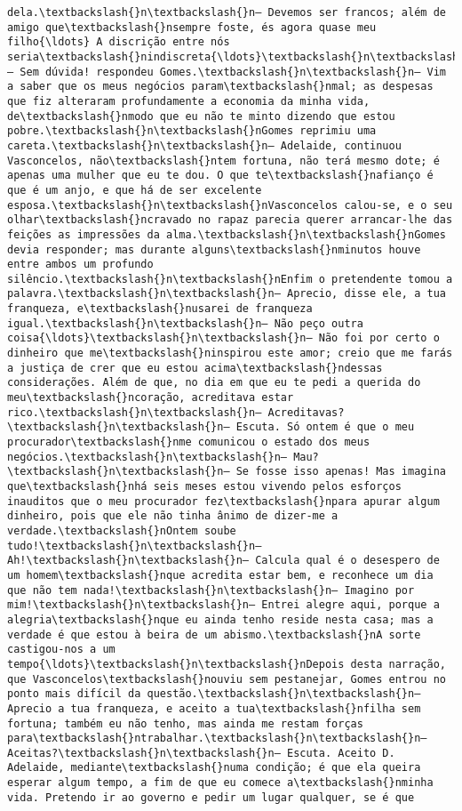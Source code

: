 \begin{Verbatim}[commandchars=\\\{\}]
dela.\textbackslash{}n\textbackslash{}n— Devemos ser francos; além de amigo que\textbackslash{}nsempre foste, és agora quase meu filho{\ldots} A discrição entre nós seria\textbackslash{}nindiscreta{\ldots}\textbackslash{}n\textbackslash{}n— Sem dúvida! respondeu Gomes.\textbackslash{}n\textbackslash{}n— Vim a saber que os meus negócios param\textbackslash{}nmal; as despesas que fiz alteraram profundamente a economia da minha vida, de\textbackslash{}nmodo que eu não te minto dizendo que estou pobre.\textbackslash{}n\textbackslash{}nGomes reprimiu uma careta.\textbackslash{}n\textbackslash{}n— Adelaide, continuou Vasconcelos, não\textbackslash{}ntem fortuna, não terá mesmo dote; é apenas uma mulher que eu te dou. O que te\textbackslash{}nafianço é que é um anjo, e que há de ser excelente esposa.\textbackslash{}n\textbackslash{}nVasconcelos calou-se, e o seu olhar\textbackslash{}ncravado no rapaz parecia querer arrancar-lhe das feições as impressões da alma.\textbackslash{}n\textbackslash{}nGomes devia responder; mas durante alguns\textbackslash{}nminutos houve entre ambos um profundo silêncio.\textbackslash{}n\textbackslash{}nEnfim o pretendente tomou a palavra.\textbackslash{}n\textbackslash{}n— Aprecio, disse ele, a tua franqueza, e\textbackslash{}nusarei de franqueza igual.\textbackslash{}n\textbackslash{}n— Não peço outra coisa{\ldots}\textbackslash{}n\textbackslash{}n— Não foi por certo o dinheiro que me\textbackslash{}ninspirou este amor; creio que me farás a justiça de crer que eu estou acima\textbackslash{}ndessas considerações. Além de que, no dia em que eu te pedi a querida do meu\textbackslash{}ncoração, acreditava estar rico.\textbackslash{}n\textbackslash{}n— Acreditavas?\textbackslash{}n\textbackslash{}n— Escuta. Só ontem é que o meu procurador\textbackslash{}nme comunicou o estado dos meus negócios.\textbackslash{}n\textbackslash{}n— Mau?\textbackslash{}n\textbackslash{}n— Se fosse isso apenas! Mas imagina que\textbackslash{}nhá seis meses estou vivendo pelos esforços inauditos que o meu procurador fez\textbackslash{}npara apurar algum dinheiro, pois que ele não tinha ânimo de dizer-me a verdade.\textbackslash{}nOntem soube tudo!\textbackslash{}n\textbackslash{}n— Ah!\textbackslash{}n\textbackslash{}n— Calcula qual é o desespero de um homem\textbackslash{}nque acredita estar bem, e reconhece um dia que não tem nada!\textbackslash{}n\textbackslash{}n— Imagino por mim!\textbackslash{}n\textbackslash{}n— Entrei alegre aqui, porque a alegria\textbackslash{}nque eu ainda tenho reside nesta casa; mas a verdade é que estou à beira de um abismo.\textbackslash{}nA sorte castigou-nos a um tempo{\ldots}\textbackslash{}n\textbackslash{}nDepois desta narração, que Vasconcelos\textbackslash{}nouviu sem pestanejar, Gomes entrou no ponto mais difícil da questão.\textbackslash{}n\textbackslash{}n— Aprecio a tua franqueza, e aceito a tua\textbackslash{}nfilha sem fortuna; também eu não tenho, mas ainda me restam forças para\textbackslash{}ntrabalhar.\textbackslash{}n\textbackslash{}n— Aceitas?\textbackslash{}n\textbackslash{}n— Escuta. Aceito D. Adelaide, mediante\textbackslash{}numa condição; é que ela queira esperar algum tempo, a fim de que eu comece a\textbackslash{}nminha vida. Pretendo ir ao governo e pedir um lugar qualquer, se é que 
\end{Verbatim}
